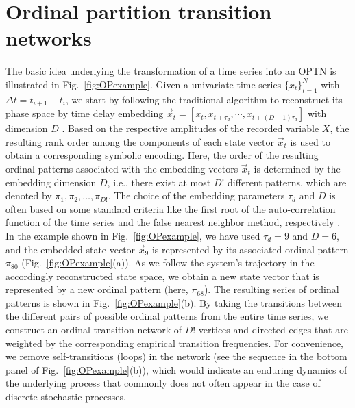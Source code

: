 \documentclass[12pt,aip,cha,reprint,nofootinbib]{revtex4-1}
\begin{document}
\section{Ordinal partition transition networks} \label{sec:intro}
The basic idea underlying the transformation of a time series into an OPTN is illustrated in Fig.~\ref{fig:OPexample}. Given a univariate time series $\{x_t\}_{t=1}^N$ with $\Delta t = t_{i+1} - t_{i}$, we start by following the traditional algorithm to reconstruct its phase space by time delay embedding $\vec{x}_{t} = [x_{t}, x_{t+\tau_d}, \cdots, x_{t+(D-1)\tau_d}]$ with dimension $D$ \cite{Takens1981,Kantz97}. Based on the respective amplitudes of the recorded variable $X$, the resulting rank order among the components of each state vector $\vec{x}_t$ is used to obtain a corresponding symbolic encoding. Here, the order of the resulting ordinal patterns associated with the embedding vectors $\vec{x}_{t}$ is determined by the embedding dimension $D$, i.e., there exist at most $D!$ different patterns, which are denoted by $\pi_1, \pi_2, \dots, \pi_{D!}$. The choice of the embedding parameters $\tau_d$ and $D$ is often based on some standard criteria like the first root of the auto-correlation function of the time series and the false nearest neighbor method, respectively \cite{Kantz97}. In the example shown in Fig.~\ref{fig:OPexample}, we have used $\tau_d = 9$ and $D = 6$, and the embedded state vector $\vec{x}_{9}$ is represented by its associated ordinal pattern $\pi_{80}$ (Fig.~\ref{fig:OPexample}(a)). As we follow the system's trajectory in the accordingly reconstructed state space, we obtain a new state vector that is represented by a new ordinal pattern (here, $\pi_{68}$). The resulting series of ordinal patterns is shown in Fig.~\ref{fig:OPexample}(b). By taking the transitions between the different pairs of possible ordinal patterns from the entire time series, we construct an ordinal transition network of $D!$ vertices and directed edges that are weighted by the corresponding empirical transition frequencies. For convenience, we remove self-transitions (loops) in the network (see the sequence in the bottom panel of Fig.~\ref{fig:OPexample}(b)), which would indicate an enduring dynamics of the underlying process that commonly does not often appear in the case of discrete stochastic processes. 
\end{document}
